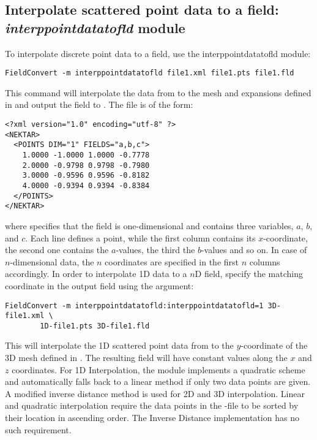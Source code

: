 \subsection{Interpolate scattered point data to a field: \textit{interppointdatatofld} module}
\label{s:utilities:fieldconvert:sub:interppointdatatofld}
To interpolate discrete point data to a field, use the interppointdatatofld module:
%
\begin{lstlisting}[style=BashInputStyle]
FieldConvert -m interppointdatatofld file1.xml file1.pts file1.fld
\end{lstlisting}
%
This command will interpolate the data from  to the mesh
and expansions defined in  and output the field to .
The file  is of the form:
%
\begin{lstlisting}[style=XMLStyle]
<?xml version="1.0" encoding="utf-8" ?>
<NEKTAR>
  <POINTS DIM="1" FIELDS="a,b,c">
    1.0000 -1.0000 1.0000 -0.7778
    2.0000 -0.9798 0.9798 -0.7980
    3.0000 -0.9596 0.9596 -0.8182
    4.0000 -0.9394 0.9394 -0.8384
  </POINTS>
</NEKTAR>
\end{lstlisting}
%
where  specifies that the field is one-dimensional
and contains three variables, $a$, $b$, and $c$.
Each line defines a point, while the  first column contains its $x$-coordinate,
the second one contains the $a$-values, the third the $b$-values and so on.
In case of $n$-dimensional data, the $n$ coordinates are specified in the first $n$
columns accordingly.
%
In order to interpolate 1D data to a $n$D field, specify the matching coordinate in
the output field using the  argument:
%
\begin{lstlisting}[style=BashInputStyle]
FieldConvert -m interppointdatatofld:interppointdatatofld=1 3D-file1.xml \
		1D-file1.pts 3D-file1.fld
\end{lstlisting}
%
This will interpolate the 1D scattered point data from  to the
$y$-coordinate of the 3D mesh defined in \inltt{3D-file1.xml}. The resulting field
will have constant values along the $x$ and $z$ coordinates.
For 1D Interpolation, the module implements a quadratic scheme and automatically
falls back to a linear method if only two data points are given.
A modified inverse distance method is used for 2D and 3D interpolation.
Linear and quadratic interpolation require the data points in the -file to be
sorted by their location in ascending order.
The Inverse Distance implementation has no such requirement.
%
%
%
